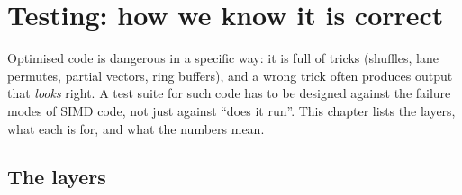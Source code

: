 \chapter{Testing: how we know it is correct}\label{ch:testing}

Optimised code is dangerous in a specific way: it is full of tricks (shuffles, lane permutes, partial vectors, ring buffers), and a wrong trick often produces output that \emph{looks} right. A test suite for such code has to be designed against the failure modes of SIMD code, not just against ``does it run''. This chapter lists the layers, what each is for, and what the numbers mean.

\section{The layers}


